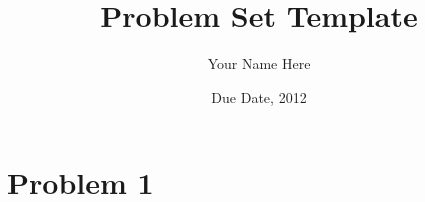 \documentclass[10pt,letter]{article}
\begin{document}


\title{Problem Set Template}

\author{Your Name Here}

\date{Due Date, 2012}
 
\maketitle 


\section*{Problem 1}
\end{document}

